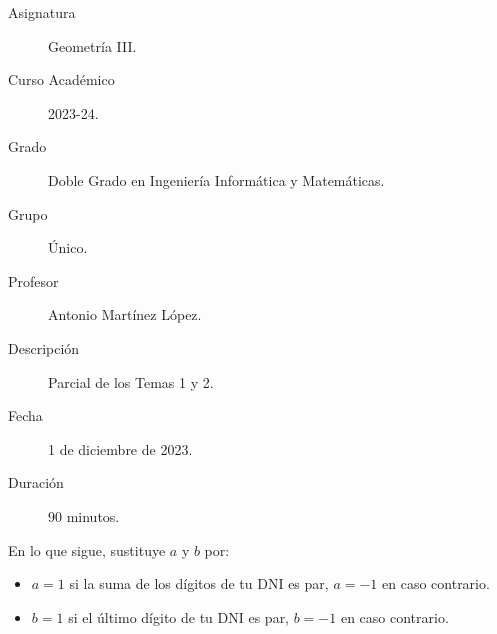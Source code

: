 \documentclass[12pt]{article}
\begin{document}

    
    

    \begin{description}
        \item[Asignatura] Geometría III.
        \item[Curso Académico] 2023-24.
        \item[Grado] Doble Grado en Ingeniería Informática y Matemáticas.
        \item[Grupo] Único.
        \item[Profesor] Antonio Martínez López.
        \item[Descripción] Parcial de los Temas 1 y 2.
        \item[Fecha] 1 de diciembre de 2023.
        \item[Duración] 90 minutos.
    
    \end{description}
    \newpage

    En lo que sigue, sustituye $a$ y $b$ por:
    \begin{itemize}
        \item $a=1$ si la suma de los dígitos de tu DNI es par, $a=-1$ en caso contrario.
        \item $b=1$ si el último dígito de tu DNI es par, $b=-1$ en caso contrario.
    \end{itemize}
    
\end{document}
